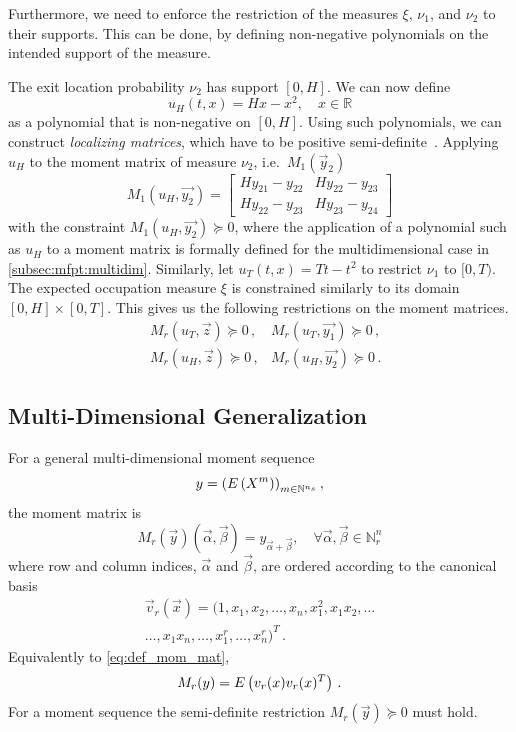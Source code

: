 Furthermore, we need to enforce the restriction of the measures $\xi$, $\nu_1$, and $\nu_2$
to their supports.
This can be done, by defining non-negative polynomials
on the intended support of the measure.
\begin{example}
The exit location probability $\nu_2$ has support $[0,H]$. We can now define
	\[
u_H(t,x) = Hx - x^2, \quad x\in \mathbb R
\]
as a polynomial that is non-negative on $[0,H]$.
Using such polynomials, we can construct \emph{localizing matrices},
which have to be positive semi-definite~\parencite{lasserre2010moments}.
Applying $u_H$ to the moment matrix of measure $\nu_2$, i.e.\ $M_1(\vec{y}_2)$
	\[
M_1(u_H, \vec{y_2})=
\begin{bmatrix}
    Hy_{21} - y_{22} & Hy_{22} - y_{23} \\
    Hy_{22} - y_{23} & Hy_{23} - y_{24}
\end{bmatrix}
\]
with the constraint $M_1(u_H, \vec{y_2})\succeq 0$, where the application of
a polynomial such as $u_H$ to a moment matrix
is formally defined for the multidimensional case in \autoref{subsec:mfpt:multidim}.
Similarly, let $u_T(t, x) = Tt-t^2$ to restrict $\nu_1$ to $[0,T)$.
The expected occupation measure $\xi$ is constrained similarly to its domain
$[0,H]\times[0,T]$.
This gives us the following restrictions on the moment matrices.
\begin{equation}\label{eq:localizing_sd_constraints}
\begin{split}
	& M_r(u_T,\vec{z})\succeq 0\,, &M_r(u_T,\vec{y_1})\succeq 0\,,\\
	& M_r(u_H,\vec{z})\succeq 0\,, &M_r(u_H,\vec{y_2})\succeq 0\,.
\end{split}
\end{equation}
\end{example}

\subsection{Multi-Dimensional Generalization}
\label{subsec:mfpt:multidim}
For a general multi-dimensional moment sequence
\[
	y={\left({E}\left(X^{m}\right)\right)}_{m\in\mathbb{N}^{n_s}}\,,
\]
	the moment
matrix is~\parencite{lasserre2010moments}
\begin{equation}\label{eq:def_mom_mat}
	M_r(\vec y)(\vec\alpha,\vec\beta)
=y_{\vec\alpha + \vec\beta},\quad\forall\vec{\alpha},
\vec{\beta}\in\mathbb{N}_r^n
\end{equation}
where row and column indices, $\vec{\alpha}$ and $\vec\beta$, are ordered according to the canonical basis
\begin{multline}\label{eq:canoncial_basis}
\vec{v}_r(\vec{x}) =
(1,x_1,x_2,\dots,x_n,x_1^2,x_1x_2,\dots \\
	\dots, x_1x_n,\dots ,x_1^r,\dots
	,x_n^r)^T\,.
\end{multline}
Equivalently to \eqref{eq:def_mom_mat},
\[
	M_r(y)={E}\left(v_r (x)v_r(x)^T\right)\,.
\]
For a moment sequence the semi-definite restriction $M_r(\vec{y})\succeq 0$ must hold.

